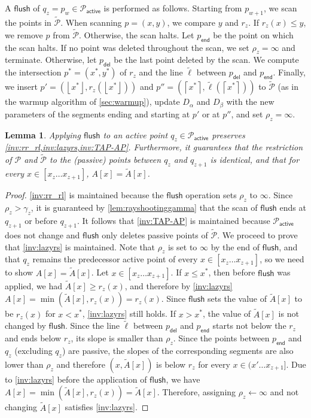 \documentclass[10pt,a4paper]{article}
\newtheorem{lemma}[theorem]{Lemma}
\newcommand{\assign}{\leftarrow}
\renewcommand{\P}{\mathcal{P}}
\newcommand{\AP}{\P_{\mathsf{active}}}
\newcommand{\TA}{\tilde{A}}
\newcommand{\tell}{\tilde{\ell}}
\newcommand{\TP}{\tilde{\P}}
\newcommand{\ray}{r}
\newcommand{\rl}[1]{\rho_{#1}}
\newcommand{\flush}{\mathsf{flush}}
\newcommand{\ceil}[1]{\left\lceil{#1}\right\rceil}
\newcommand{\floor}[1]{\left\lfloor{#1}\right\rfloor}
\begin{document}
A $\flush$ of $q_z = p_w \in \AP$ is performed as follows.
Starting from $p_{w+1}$, we scan the points in $\TP$.
When scanning $p=(x,y)$, we compare $y$ and $\ray_z$. 
If $\ray_z(x) \le y$, we remove $p$ from $\TP$.
Otherwise, the scan halts. 
Let $p_{\mathsf{end}}$ be the point on which the scan halts.
If no point was deleted throughout the scan, we set $\rl{z} = \infty$ and terminate.
Otherwise, let $p_{\mathsf{del}}$ be the last point deleted by the scan.
We compute the intersection $p^*=(x^*,y^*)$ of $\ray_z$ and the line $\tell$ between $p_{\mathsf{del}}$ and $p_{\mathsf{end}}$.
Finally, we insert $p'=(\floor{x^*}, \ray_z(\floor{x^*}))$ and $p''= (\ceil{x^*}, \tell(\ceil{x^*}))$ to $\TP$ (as in the warmup algorithm of \cref{sec:warmup}), update $D_\alpha$ and $D_\beta$ with the new parameters of the segments ending and starting at $p'$ or at $p''$, and set $\rl{z} = \infty$.

\begin{lemma}\label{lem:flush}
Applying $\flush$ to an active point $q_z \in \AP$ preserves \cref{inv:rr_rl,inv:lazyrs,inv:TAP-AP}.
Furthermore, it guarantees that 
the restriction of $\P$ and $\TP$ to the (passive) points between $q_z$ and $q_{z+1}$
is identical,
and that for every $x\in[x_z \ldots x_{z+1}]$, $A[x]=\TA[x]$.
\end{lemma}
\begin{proof}
\cref{inv:rr_rl} is maintained because the $\flush$ operation sets $\rl{z}$ to $\infty$.
Since $\rl{z} > \gamma_{z}$, it is guaranteed by \cref{lem:rayshootinggamma}  that the scan of $\flush$ ends at $q_{z+1}$ or before $q_{z+1}$.
It follows that \cref{inv:TAP-AP} is maintained because $\AP$ does not change and $\flush$ only deletes passive points of $\TP$.
We proceed to prove that \cref{inv:lazyrs} is maintained.
Note that $\rl{z}$ is set to $\infty$ by the end of $\flush$, and that $q_z$ remains the predecessor active point of every $x\in [x_z \ldots x_{z+1}]$, so we need to show $A[x] = \TA[x]$.
Let $x \in [x_z \ldots x_{z+1}]$.
If $x \le x^*$, then before $\flush$ was applied, we had $\TA[x] \ge \ray_{z}(x)$, and therefore by \cref{inv:lazyrs} $A[x] = \min(\TA[x] , \ray_{z}(x)) = \ray_{z}(x)$. Since $\flush$ sets the value of $\TA[x]$ to be $\ray_z(x)$ for $x<x^*$, \cref{inv:lazyrs} still holds.
If $x > x^*$, the value of $\TA[x]$ is not changed by $\flush$.
Since the line $\tell$ between $p_{\mathsf{del}}$ and $p_{\mathsf{end}}$ starts not below the $\ray_{z}$ and ends below $\ray_{z}$, its slope is smaller than $\rl{z}$.
Since the points between $p_{\mathsf{end}}$ and $q_z$ (excluding $q_z$) are passive, the slopes of the corresponding segments are also lower than $\rl{z}$ and therefore $(x,\TA[x])$ is below $\ray_{z}$ for every $x \in (x' \ldots x_{z+1}]$.
Due to \cref{inv:lazyrs} before the application of $\flush$, we have $A[x] = \min(\TA[x], \ray_{z}(x)) = \TA[x]$.
Therefore, assigning $\rl{z} \assign \infty$ and not changing $\TA[x]$ satisfies \cref{inv:lazyrs}.
\end{proof}
\end{document}
